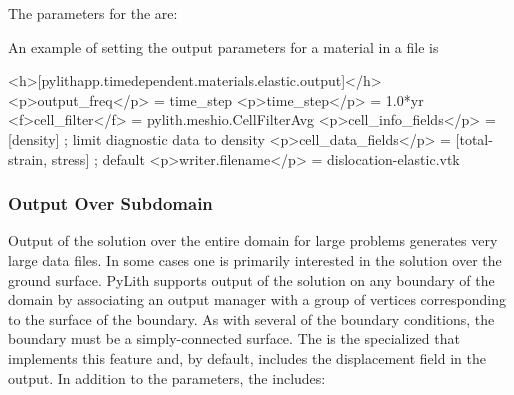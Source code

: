 The parameters for the  are:
\begin{inventory}
\end{inventory}
An example of setting the output parameters for a material in a 
file is
\begin{cfg}
<h>[pylithapp.timedependent.materials.elastic.output]</h>
<p>output_freq</p> = time_step
<p>time_step</p> = 1.0*yr
<f>cell_filter</f> = pylith.meshio.CellFilterAvg
<p>cell_info_fields</p> = [density] ; limit diagnostic data to density
<p>cell_data_fields</p> = [total-strain, stress] ; default
<p>writer.filename</p> = dislocation-elastic.vtk
\end{cfg}

\subsubsection{Output Over Subdomain}
\label{sec:output:subdomain}

Output of the solution over the entire domain for large problems generates
very large data files. In some cases one is primarily interested in
the solution over the ground surface. PyLith supports output of the
solution on any boundary of the domain by associating an output manager
with a group of vertices corresponding to the surface of the boundary.
As with several of the boundary conditions, the boundary must be a
simply-connected surface. The  is the specialized
 that implements this feature and, by default, includes
the displacement field in the output. In addition to the 
parameters, the  includes:
\begin{inventory}
\end{inventory}

